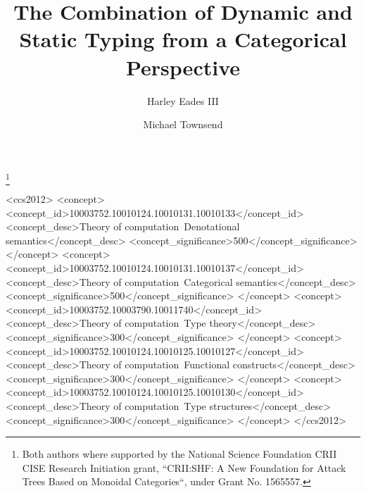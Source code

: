 \documentclass[sigplan]{acmart}\settopmatter{printfolios=true}
\begin{document}
\title{The Combination of Dynamic and Static Typing from a Categorical Perspective}
\author{Harley Eades III}

\author{Michael Townsend}

\thanks{Both authors where supported by the National Science
  Foundation CRII CISE Research Initiation grant, ``CRII:SHF: A New
  Foundation for Attack Trees Based on Monoidal Categories``, under
  Grant No. 1565557.}

\begin{CCSXML}
<ccs2012>
<concept>
<concept_id>10003752.10010124.10010131.10010133</concept_id>
<concept_desc>Theory of computation~Denotational semantics</concept_desc>
<concept_significance>500</concept_significance>
</concept>
<concept>
<concept_id>10003752.10010124.10010131.10010137</concept_id>
<concept_desc>Theory of computation~Categorical semantics</concept_desc>
<concept_significance>500</concept_significance>
</concept>
<concept>
<concept_id>10003752.10003790.10011740</concept_id>
<concept_desc>Theory of computation~Type theory</concept_desc>
<concept_significance>300</concept_significance>
</concept>
<concept>
<concept_id>10003752.10010124.10010125.10010127</concept_id>
<concept_desc>Theory of computation~Functional constructs</concept_desc>
<concept_significance>300</concept_significance>
</concept>
<concept>
<concept_id>10003752.10010124.10010125.10010130</concept_id>
<concept_desc>Theory of computation~Type structures</concept_desc>
<concept_significance>300</concept_significance>
</concept>
</ccs2012>
\end{CCSXML}

\end{document}
